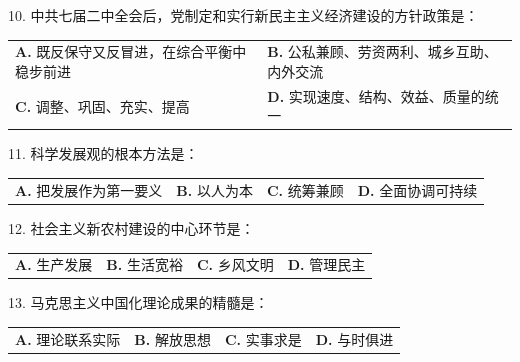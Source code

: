 \documentclass[UTF8,11pt]{ctexart}
\begin{document}
10. 中共七届二中全会后，党制定和实行新民主主义经济建设的方针政策是：


\begin{center}\begin{tabular}{>{\raggedright\arraybackslash}p{\dimexpr(\linewidth-4\tabcolsep)/2\relax}>{\raggedright\arraybackslash}p{\dimexpr(\linewidth-4\tabcolsep)/2\relax}}
\textbf{A.} 既反保守又反冒进，在综合平衡中稳步前进 & \textbf{B.} 公私兼顾、劳资两利、城乡互助、内外交流\\[.35em]
\textbf{C.} 调整、巩固、充实、提高 & \textbf{D.} 实现速度、结构、效益、质量的统一\\[.35em]\end{tabular}\end{center}

11. 科学发展观的根本方法是：


\begin{center}\begin{tabular}{>{\raggedright\arraybackslash}p{\dimexpr(\linewidth-8\tabcolsep)/4\relax}>{\raggedright\arraybackslash}p{\dimexpr(\linewidth-8\tabcolsep)/4\relax}>{\raggedright\arraybackslash}p{\dimexpr(\linewidth-8\tabcolsep)/4\relax}>{\raggedright\arraybackslash}p{\dimexpr(\linewidth-8\tabcolsep)/4\relax}}
\textbf{A.} 把发展作为第一要义 & \textbf{B.} 以人为本 & \textbf{C.} 统筹兼顾 & \textbf{D.} 全面协调可持续\\[.35em]\end{tabular}\end{center}

12. 社会主义新农村建设的中心环节是：


\begin{center}\begin{tabular}{>{\raggedright\arraybackslash}p{\dimexpr(\linewidth-8\tabcolsep)/4\relax}>{\raggedright\arraybackslash}p{\dimexpr(\linewidth-8\tabcolsep)/4\relax}>{\raggedright\arraybackslash}p{\dimexpr(\linewidth-8\tabcolsep)/4\relax}>{\raggedright\arraybackslash}p{\dimexpr(\linewidth-8\tabcolsep)/4\relax}}
\textbf{A.} 生产发展 & \textbf{B.} 生活宽裕 & \textbf{C.} 乡风文明 & \textbf{D.} 管理民主\\[.35em]\end{tabular}\end{center}

13. 马克思主义中国化理论成果的精髓是：


\begin{center}\begin{tabular}{>{\raggedright\arraybackslash}p{\dimexpr(\linewidth-8\tabcolsep)/4\relax}>{\raggedright\arraybackslash}p{\dimexpr(\linewidth-8\tabcolsep)/4\relax}>{\raggedright\arraybackslash}p{\dimexpr(\linewidth-8\tabcolsep)/4\relax}>{\raggedright\arraybackslash}p{\dimexpr(\linewidth-8\tabcolsep)/4\relax}}
\textbf{A.} 理论联系实际 & \textbf{B.} 解放思想 & \textbf{C.} 实事求是 & \textbf{D.} 与时俱进\\[.35em]\end{tabular}\end{center}
\end{document}
